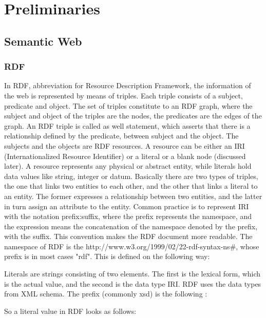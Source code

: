 \chapter{Preliminaries}

\section{Semantic Web}

\subsection{RDF}

In RDF, abbreviation for Resource Description Framework, the information of the web is represented by means of triples. Each triple consists of a subject, predicate and object. The set of triples constitute to an RDF graph, where the subject and object of the triples are the nodes, the predicates are the edges of the graph.
An RDF triple is called as well statement, which asserts that there is a relationship defined by the predicate, between subject and the object. The subjects and the objects are RDF resources. A resource can be either an IRI (Internationalized Resource Identifier) or a literal or a blank node (discussed later). A resource represents any physical or abstract entity, while literals hold data values like string, integer or datum. 
Basically there are two types of triples, the one that links two entities to each other, and the other that links a literal to an entity. The former expresses a relationship between two entities, and the latter in turn assign an attribute to the entity.
Common practice is to represent IRI with the notation prefix:suffix, where the prefix represents the namespace, and the expression means the concatenation of the namespace denoted by the prefix, with the suffix. This convention makes the RDF document more readable. The namespace of RDF is the http://www.w3.org/1999/02/22-rdf-syntax-ns\#, whose prefix is in most cases "rdf".   This is defined on the following way:



Literals are strings consisting of two elements. The first is the lexical form, which is the actual value, and the second is the data type IRI.  RDF uses the data types from XML schema. The prefix (commonly xsd) is the following :


So a literal value in RDF looks as follows:

